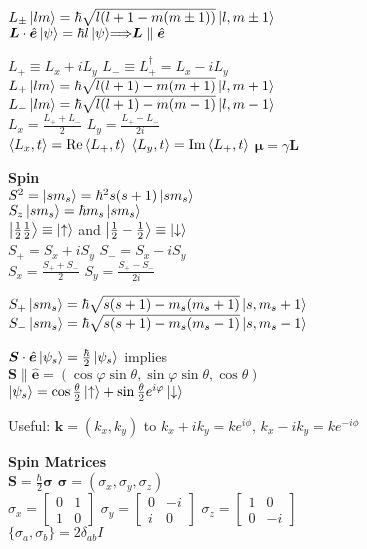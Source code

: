\documentclass[11pt, a4paper]{article}
\newcommand{\newsec}[1]{\vspace{2mm}\textbf{#1}\\}
\renewcommand{\vec}[1]{\bm{#1}} %
\newcommand{\uvec}[1]{\hat{\vec{#1}}} %
\let\spaceyimplies\implies
\renewcommand{\implies}{\hspace{-1mm}\spaceyimplies\hspace{-1mm}}
\newcommand{\ua}{\uparrow}  %
\newcommand{\da}{\downarrow}  %
\renewcommand{\k}[1]{\ket{#1}}
\begin{document}
\begin{multicols}{2}
$L_\pm \ket{lm} = \hbar \sqrt{l(l+1 - m (m \pm 1))} \ket{l, m \pm 1}$ \medskip \\


$ \vec{L}\cdot \uvec{e} \ket{\psi} = \hbar l \ket{\psi} \implies \vec{L} \parallel \uvec{e} $

$ L_{+} \equiv L_{x} + i L_{y} $ \qquad $ L_{-} \equiv L_{+}^{\dagger} = L_{x} - i L_{y} $\\
$ L_{+}\ket{lm} = \hbar \sqrt{l (l+1) - m(m+1)} \ket{l, m+1} $ \\
$ L_{-}\ket{lm} = \hbar \sqrt{l (l+1) - m(m-1)} \ket{l, m-1}  $\\
$ L_{x} = \frac{L_{+} + L_{-}}{2} $ \qquad \qquad \quad  $ L_{y} = \frac{L_{+} - L_{-}}{2i} $\\
$ \ev{L_{x}, t} = \Re \ev{L_{+}, t} $ \qquad $ \ev{L_{y}, t}= \Im \ev{L_{+}, t} $
$ \bm{\mu} = \gamma \bm{L} $


\newsec{Spin}
$ S^{2} = \k{sm_{s}} = \hbar^{2}s(s+1)\k{sm_{s}} $ \\
$ S_{z}\k{sm_{s}} = \hbar m_{s}\k{sm_{s}} $ \\
$  \ket{\frac{1}{2}\frac{1}{2}}  \equiv \k{\ua} $ and $ \ket{\frac{1}{2}-\frac{1}{2}}  \equiv \ket{\da} $\\

$ S_{+} = S_{x} + iS_{y} $ \qquad $ S_{-} = S_{x} - i S_{y} $\\
$ S_{x} = \frac{S_{+}+S_{-}}{2} $ \qquad \quad $ S_{y} = \frac{S_{+}-S_{-}}{2i} $

$ S_{+} \ket{sm_{s}} = \hbar \sqrt{s(s+1) - m_{s}(m_{s}+1)}\ket{s, m_{s}+1} $\\
$ S_{-} \ket{sm_{s}} = \hbar \sqrt{s(s+1) - m_{s}(m_{s}-1)}\ket{s, m_{s}-1} $



$ \vec{S} \cdot \uvec{e} \ket{\psi_{s}} = \frac{\hbar}{2}\ket{\psi_{s}} $ implies\\
\null \quad $  \vec{S} \parallel \uvec{e} = (\cos \varphi \sin \theta, \sin \varphi \sin \theta, \cos \theta) $  \\
\null \quad $ \ket{\psi_{s}} = \cos \frac{\theta}{2} \ket{\ua} + \sin \frac{\theta}{2} e^{i\varphi} \ket{\da} $

Useful:  $ \vec{k} = (k_{x}, k_{y}) $ to $ 	k_{x} + ik_{y} = ke^{i\phi}  $, $ k_{x} - ik_{y} = ke^{-i\phi} $

\newsec{Spin Matrices}
$ \vec{S} = \frac{\hbar}{2}\vec{\sigma} $ \qquad  $  \vec{\sigma} = (\sigma_{x}, \sigma_{y}, \sigma_{z}) $\\
$ \sigma_{x} = 
\begin{bmatrix}
	0 & 1\\
	1 & 0
\end{bmatrix} $
\quad 
$ \sigma_{y} = 
\begin{bmatrix}
	0 & -i\\
	i & 0
\end{bmatrix} $
\quad 
$ \sigma_{z} = 
\begin{bmatrix}
	1 & 0\\
	0 & -i
\end{bmatrix} $\\
$ \{\sigma_{a}, \sigma_{b}\} = 2\delta_{ab}I $ 



\end{multicols}
\end{document}
